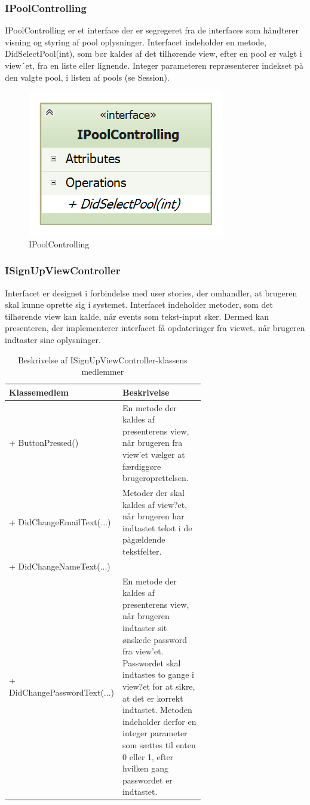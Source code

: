 \subsubsection{IPoolControlling}
IPoolControlling er et interface der er segregeret fra de interfaces som håndterer visning og styring af pool oplysninger. Interfacet indeholder en metode, DidSelectPool(int), som bør kaldes af det tilhørende view, efter en pool er valgt i view´et, fra en liste eller lignende. Integer parameteren repræsenterer indekset på den valgte pool, i listen af pools (se Session).  
\begin{figure}
	\centering
	\includegraphics[width=0.3\linewidth]{figs/design/application_ipoolcontrolling}
	\caption{IPoolControlling}
	\label{fig:application_ipoolcontrolling}
\end{figure}

\subsubsection{ISignUpViewController}
Interfacet er designet i forbindelse med user stories, der omhandler, at brugeren skal kunne oprette sig i systemet. Interfacet indeholder metoder, som det tilhørende view kan kalde, når events som tekst-input sker. Dermed kan presenteren, der implementerer interfacet få opdateringer fra viewet, når brugeren indtaster sine oplysninger.

\begin{table}
	\centering
	\begin{tabular}{| l | p{0.65\linewidth} |}
		\toprule
		\textbf{Klassemedlem}	& \textbf{Beskrivelse} \\
		\midrule
		+ ButtonPressed()				& En metode der kaldes af presenterens view, når brugeren fra view'et vælger at færdiggøre brugeroprettelsen.	\\\hline
		+ DidChangeEmailText(...) 			& Metoder der skal kaldes af view?et, når brugeren har indtastet tekst i de pågældende tekstfelter. \\
		+ DidChangeNameText(...)  			& \\\hline
		+ DidChangePasswordText(...) 				& En metode der kaldes af presenterens view, når brugeren indtaster sit ønskede password fra view'et. Passwordet skal indtastes to gange i view?et for at sikre, at det er korrekt indtastet. Metoden indeholder derfor en integer parameter som sættes til enten 0 eller 1, efter hvilken gang passwordet er indtastet. \\
		\bottomrule
		\end{tabular}
	\caption{Beskrivelse af ISignUpViewController-klassens medlemmer}
	\label{tab:table_design_isignupviewcontroller}	
\end{table}

